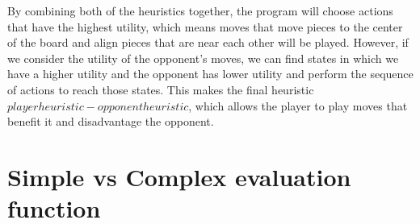 \documentclass[11pt]{article}
\begin{document}
By combining both of the heuristics together, the program will choose actions that have the highest utility, which means moves that move pieces to the center of the board and align pieces that are near each other will be played. However, if we consider the utility of the opponent's moves, we can find states in which we have a higher utility and the opponent has lower utility and perform the sequence of actions to reach those states. This makes the final heuristic $ player heuristic - opponent heuristic $, which allows the player to play moves that benefit it and disadvantage the opponent. 
\section{Simple vs Complex evaluation function}
\end{document}
